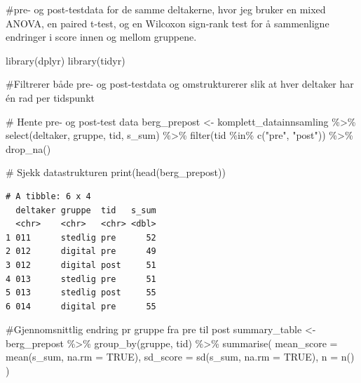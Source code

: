 \documentclass[
  letterpaper,
  DIV=11,
  numbers=noendperiod]{scrreprt}
\newenvironment{Shaded}{\begin{snugshade}}{\end{snugshade}}
\newcommand{\AttributeTok}[1]{\textcolor[rgb]{0.40,0.45,0.13}{#1}}
\newcommand{\CommentTok}[1]{\textcolor[rgb]{0.37,0.37,0.37}{#1}}
\newcommand{\ConstantTok}[1]{\textcolor[rgb]{0.56,0.35,0.01}{#1}}
\newcommand{\FunctionTok}[1]{\textcolor[rgb]{0.28,0.35,0.67}{#1}}
\newcommand{\NormalTok}[1]{\textcolor[rgb]{0.00,0.23,0.31}{#1}}
\newcommand{\OtherTok}[1]{\textcolor[rgb]{0.00,0.23,0.31}{#1}}
\newcommand{\SpecialCharTok}[1]{\textcolor[rgb]{0.37,0.37,0.37}{#1}}
\newcommand{\StringTok}[1]{\textcolor[rgb]{0.13,0.47,0.30}{#1}}
\begin{document}
\#pre- og post-testdata for de samme deltakerne, hvor jeg bruker en
mixed ANOVA, en paired t-test, og en Wilcoxon sign-rank test for å
sammenligne endringer i score innen og mellom gruppene.

\begin{Shaded}
\begin{Highlighting}[]
\FunctionTok{library}\NormalTok{(dplyr)}
\FunctionTok{library}\NormalTok{(tidyr)}

\CommentTok{\#Filtrerer både pre{-} og post{-}testdata og omstrukturerer slik at hver deltaker har én rad per tidspunkt}

\CommentTok{\# Hente pre{-} og post{-}test data}
\NormalTok{berg\_prepost }\OtherTok{\textless{}{-}}\NormalTok{ komplett\_datainnsamling }\SpecialCharTok{\%\textgreater{}\%}
  \FunctionTok{select}\NormalTok{(deltaker, gruppe, tid, s\_sum) }\SpecialCharTok{\%\textgreater{}\%}
  \FunctionTok{filter}\NormalTok{(tid }\SpecialCharTok{\%in\%} \FunctionTok{c}\NormalTok{(}\StringTok{"pre"}\NormalTok{, }\StringTok{"post"}\NormalTok{)) }\SpecialCharTok{\%\textgreater{}\%}
  \FunctionTok{drop\_na}\NormalTok{()}

\CommentTok{\# Sjekk datastrukturen}
\FunctionTok{print}\NormalTok{(}\FunctionTok{head}\NormalTok{(berg\_prepost))}
\end{Highlighting}
\end{Shaded}

\begin{verbatim}
# A tibble: 6 x 4
  deltaker gruppe  tid   s_sum
  <chr>    <chr>   <chr> <dbl>
1 011      stedlig pre      52
2 012      digital pre      49
3 012      digital post     51
4 013      stedlig pre      51
5 013      stedlig post     55
6 014      digital pre      55
\end{verbatim}

\begin{Shaded}
\begin{Highlighting}[]
\CommentTok{\#Gjennomsnittlig endring pr gruppe fra pre til post}
\NormalTok{summary\_table }\OtherTok{\textless{}{-}}\NormalTok{ berg\_prepost }\SpecialCharTok{\%\textgreater{}\%}
  \FunctionTok{group\_by}\NormalTok{(gruppe, tid) }\SpecialCharTok{\%\textgreater{}\%}
  \FunctionTok{summarise}\NormalTok{(}
    \AttributeTok{mean\_score =} \FunctionTok{mean}\NormalTok{(s\_sum, }\AttributeTok{na.rm =} \ConstantTok{TRUE}\NormalTok{),}
    \AttributeTok{sd\_score =} \FunctionTok{sd}\NormalTok{(s\_sum, }\AttributeTok{na.rm =} \ConstantTok{TRUE}\NormalTok{),}
    \AttributeTok{n =} \FunctionTok{n}\NormalTok{()}
\NormalTok{  ) }
\end{Highlighting}
\end{Shaded}
\end{document}
